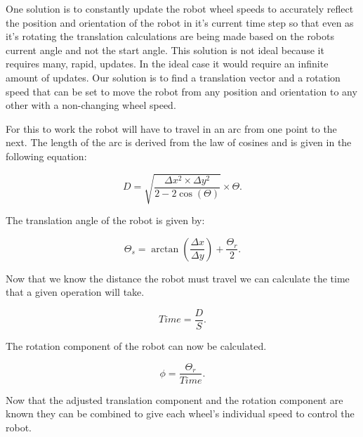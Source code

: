 One solution is to constantly update the robot wheel speeds to accurately reflect the position and orientation of the robot in it’s current time step so that even as it’s rotating the translation calculations are being made based on the robots current angle and not the start angle. This solution is not ideal because it requires many, rapid, updates. In the ideal case it would require an infinite amount of updates. Our solution is to find a translation vector and a rotation speed that can be set to move the robot from any position and orientation to any other with a non-changing wheel speed.

For this to work the robot will have to travel in an arc from one point to the next. The length of the arc is derived from the law of cosines and is given in the following equation:

\begin{equation}
D = \sqrt{\frac{\Delta x^2 \times \Delta y^2}{2 - 2 \cos (\Theta)}} \times \Theta.
\end{equation}

The translation angle of the robot is given by:

\begin{equation}
\Theta_s = \arctan (\frac {\Delta x} {\Delta y} ) + \frac {\Theta_r} {2}.
\end{equation}

Now that we know the distance the robot must travel we can calculate the time that a given operation will take.

\begin{equation}
Time = \frac {D} {S}.
\end{equation}

The rotation component of the robot can now be calculated.

\begin{equation}
\phi = \frac {\Theta_r} {Time}.
\end{equation}

Now that the adjusted translation component and the rotation component are known they can be combined to give each wheel’s individual speed to control the robot.


